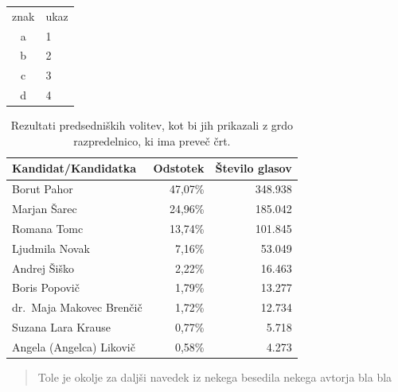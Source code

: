 \documentclass[a4paper, 10pt]{article}
\begin{document}
\begin{center}
    \begin{tabular}{cl}
        znak & ukaz \\
        a & 1 \\
        b & 2 \\
        c & 3 \\
        d & 4 \\
    \end{tabular}
\end{center}

\begin{table}[htp]
    \centering
    \begin{tabular}{|l|r|r|}
    \hline 
    \textbf{Kandidat/Kandidatka}        & \textbf{Odstotek} & \textbf{Število glasov} \\ \hline
    Borut Pahor                & 47,07\%  & 348.938 \\ \hline
    Marjan Šarec               & 24,96\%  & 185.042 \\ \hline
    Romana Tomc                & 13,74\%  & 101.845 \\ \hline
    Ljudmila Novak             & 7,16\%   & 53.049 \\ \hline
    Andrej Šiško               & 2,22\%   & 16.463 \\ \hline
    Boris Popovič              & 1,79\%   & 13.277 \\ \hline
    dr.\ Maja Makovec Brenčič  & 1,72\%   & 12.734 \\ \hline
    Suzana Lara Krause         & 0,77\%   & 5.718 \\ \hline
    Angela (Angelca) Likovič   & 0,58\%   & 4.273 \\ \hline
    \end{tabular}
    \caption{Rezultati predsedniških volitev, kot bi jih prikazali z grdo razpredelnico, ki ima preveč črt.} 
    \label{tab:volitve-vanilla}
\end{table}

\begin{quote}
    Tole je okolje za daljši navedek iz nekega besedila nekega avtorja bla bla 
\end{quote}
\end{document}
